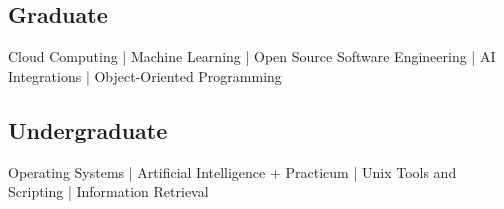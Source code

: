 \documentclass[]{hanisntsolo-resume}
\begin{document}
\begin{minipage}[t]{0.33\textwidth}
\subsection{Graduate}
Cloud Computing |
Machine Learning |
Open Source Software Engineering |
AI Integrations |
Object-Oriented Programming \\

\subsection{Undergraduate}
Operating Systems |
Artificial Intelligence + Practicum |
Unix Tools and Scripting |
Information Retrieval
\sectionsep

%
%

\end{minipage}
\hfill
\end{document}
